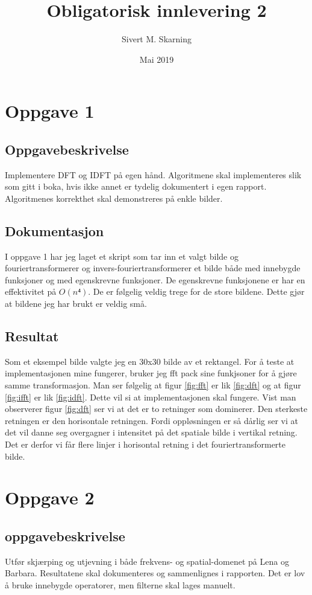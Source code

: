 \documentclass[a4paper, 12pt]{article}
\title{Obligatorisk innlevering 2}
\author{Sivert M. Skarning}
\date{Mai 2019}
\begin{document}
\maketitle

\section{Oppgave 1}
\subsection{Oppgavebeskrivelse}
Implementere DFT og IDFT på egen hånd. Algoritmene skal implementeres slik som gitt i boka, hvis ikke annet er tydelig dokumentert i egen rapport. Algoritmenes korrekthet skal demonstreres på enkle bilder.

\subsection{Dokumentasjon}
I oppgave 1 har jeg laget et skript som tar inn et valgt bilde og fouriertransformerer og invers-fouriertransformerer et bilde både med innebygde funksjoner og med egenskrevne funksjoner. De egenskrevne funksjonene er har en effektivitet på $O(n⁴)$. De er følgelig veldig trege for de store bildene. Dette gjør at bildene jeg har brukt er veldig små.
\subsection{Resultat}
Som et eksempel bilde valgte jeg en 30x30 bilde av et rektangel. For å teste at implementasjonen mine fungerer, bruker jeg fft pack sine funkjsoner for å gjøre samme transformasjon. Man ser følgelig at figur \ref{fig:fft} er lik \ref{fig:dft} og at figur \ref{fig:ifft} er lik \ref{fig:idft}. Dette vil si at implementasjonen skal fungere. Vist man observerer figur \ref{fig:dft} ser vi at det er to retninger som dominerer. Den sterkeste retningen er den horisontale retningen. Fordi oppløsningen er så dårlig ser vi at det vil danne seg overgagner i intensitet på det spatiale bilde i vertikal retning. Det er derfor vi får flere linjer i horisontal retning i det fouriertransformerte bilde.

\section{Oppgave 2}
\subsection{oppgavebeskrivelse}
Utfør skjærping og utjevning i både frekvens- og spatial-domenet på Lena og Barbara. Resultatene skal dokumenteres og sammenlignes i rapporten. Det er lov å bruke innebygde operatorer, men filterne skal lages manuelt.
\end{document}
